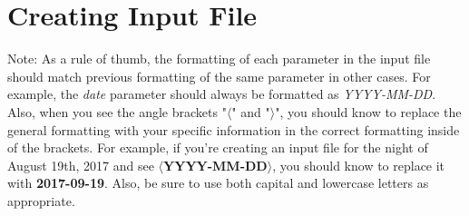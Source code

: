 \documentclass[11pt]{report}
\begin{document}
\section{Creating Input File}
Note: As a rule of thumb, the formatting of each parameter in the input file should match previous formatting of the same parameter in other cases. For example, the \emph{date} parameter should always be formatted as \emph{YYYY-MM-DD}. Also, when you see the angle brackets "$\langle$" and "$\rangle$", you should know to replace the general formatting with your specific information in the correct formatting inside of the brackets. For example, if you're creating an input file for the night of August 19th, 2017 and see {\bf $\langle$YYYY-MM-DD$\rangle$}, you should know to replace it with {\bf 2017-09-19}. Also, be sure to use both capital and lowercase letters as appropriate.
\end{document}
